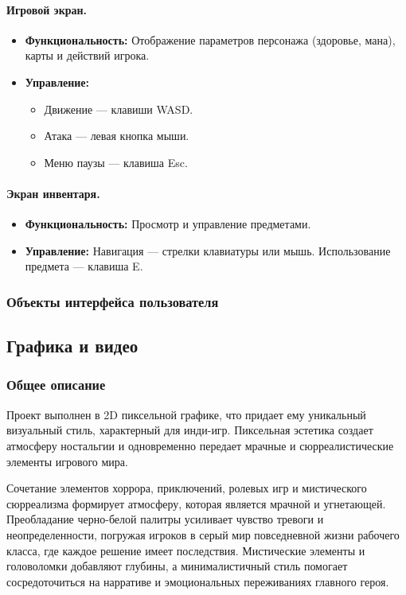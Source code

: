\documentclass{article}
\begin{document}
    \paragraph{Игровой экран.}
    \begin{itemize}
        \item \textbf{Функциональность:} Отображение параметров персонажа (здоровье, мана), карты и действий игрока.
        \item \textbf{Управление:} 
        \begin{itemize}
            \item Движение — клавиши WASD.
            \item Атака — левая кнопка мыши.
            \item Меню паузы — клавиша Esc.
        \end{itemize}
    \end{itemize}
    
    \paragraph{Экран инвентаря.}
    \begin{itemize}
        \item \textbf{Функциональность:} Просмотр и управление предметами.
        \item \textbf{Управление:} Навигация — стрелки клавиатуры или мышь. Использование предмета — клавиша E.
    \end{itemize}
    
	
	\subsubsection{Объекты интерфейса пользователя}
	
	\subsection{Графика и видео}
	\subsubsection{Общее описание}
    Проект выполнен в 2D пиксельной графике, что придает ему уникальный визуальный стиль, характерный для инди-игр. Пиксельная эстетика создает атмосферу ностальгии и одновременно передает мрачные и сюрреалистические элементы игрового мира.
    
    Сочетание элементов хоррора, приключений, ролевых игр и мистического сюрреализма формирует атмосферу, которая является мрачной и угнетающей. Преобладание черно-белой палитры усиливает чувство тревоги и неопределенности, погружая игроков в серый мир повседневной жизни рабочего класса, где каждое решение имеет последствия. Мистические элементы и головоломки добавляют глубины, а минималистичный стиль помогает сосредоточиться на нарративе и эмоциональных переживаниях главного героя.
    
\end{document}
